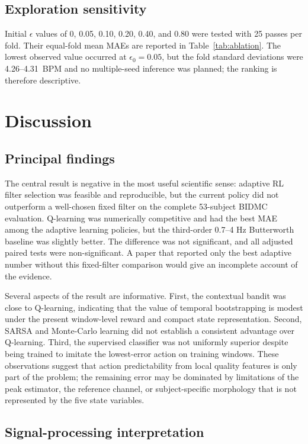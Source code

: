 \documentclass{elektr}
\begin{document}
\subsection{Exploration sensitivity}

Initial $\epsilon$ values of 0, 0.05, 0.10, 0.20, 0.40, and 0.80 were tested with 25 passes per fold. Their equal-fold mean MAEs are reported in Table~\ref{tab:ablation}. The lowest observed value occurred at $\epsilon_0=0.05$, but the fold standard deviations were 4.26--4.31~BPM and no multiple-seed inference was planned; the ranking is therefore descriptive.

\section{Discussion}

\subsection{Principal findings}

The central result is negative in the most useful scientific sense: adaptive RL filter selection was feasible and reproducible, but the current policy did not outperform a well-chosen fixed filter on the complete 53-subject BIDMC evaluation. Q-learning was numerically competitive and had the best MAE among the adaptive learning policies, but the third-order 0.7--4 Hz Butterworth baseline was slightly better. The difference was not significant, and all adjusted paired tests were non-significant. A paper that reported only the best adaptive number without this fixed-filter comparison would give an incomplete account of the evidence.

Several aspects of the result are informative. First, the contextual bandit was close to Q-learning, indicating that the value of temporal bootstrapping is modest under the present window-level reward and compact state representation. Second, SARSA and Monte-Carlo learning did not establish a consistent advantage over Q-learning. Third, the supervised classifier was not uniformly superior despite being trained to imitate the lowest-error action on training windows. These observations suggest that action predictability from local quality features is only part of the problem; the remaining error may be dominated by limitations of the peak estimator, the reference channel, or subject-specific morphology that is not represented by the five state variables.

\subsection{Signal-processing interpretation}
\end{document}

